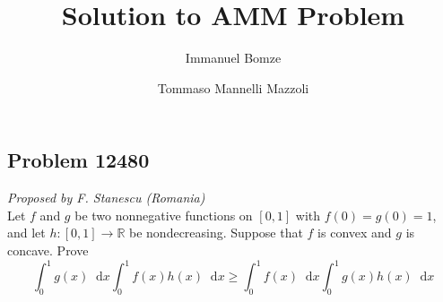 \documentclass[reqno]{amsart}
\title{Solution to AMM Problem \problemnumber}
\author[I.Bomze]{Immanuel Bomze}
\author[T. Mannelli Mazzoli]{Tommaso Mannelli Mazzoli}
\newcommand{\problemnumber}{12480}
\theoremstyle{definition}
\newcommand*\diff{\mathop{}\!\mathrm{d}}
\begin{document}
\maketitle

\subsection*{Problem \problemnumber}\textit{Proposed by F. Stanescu (Romania)} \\

Let $f$ and $g$ be two nonnegative functions on $[0,1]$ with $f(0)=g(0)=1$,
and let $h\colon [0,1] \to \mathbb{R}$ be nondecreasing. Suppose that $f$ is convex and $g$ is concave. Prove
\[
\int_0^1 g(x) \diff x \int_0^1 f(x)h(x) \diff x \ge \int_0^1 f(x) \diff x 
\int_0^1 g(x)h(x) \diff x 
\]
\end{document}
